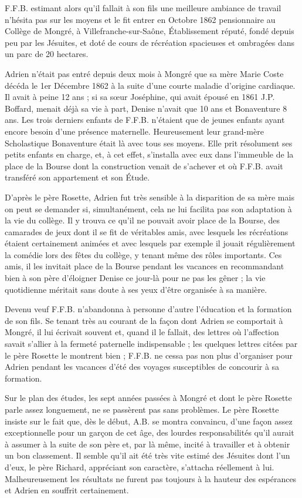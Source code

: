 \documentclass[11pt,a4paper]{report}
\begin{document}
F.F.B. estimant alors qu'il fallait à son fils une meilleure ambiance de travail n'hésita pas sur les moyens et le fit entrer en Octobre 1862 pensionnaire au Collège de Mongré, à Villefranche-sur-Saône, Établissement réputé, fondé depuis peu par les Jésuites, et doté de cours de récréation spacieuses et ombragées dans un parc de 20 hectares.

Adrien n'était pas entré depuis deux mois à Mongré que sa mère Marie Coste décéda le 1er Décembre 1862 à la suite d'une courte maladie d'origine cardiaque. Il avait à peine 12 ans ; si sa sœur Joséphine, qui avait épousé en 1861 J.P. Boffard, menait déjà sa vie à part, Denise n'avait que 10 ans et Bonaventure 8 ans. Les trois derniers enfants de F.F.B. n'étaient que de jeunes enfants ayant encore besoin d'une présence maternelle. Heureusement leur grand-mère Scholastique Bonaventure était là avec tous ses moyens. Elle prit résolument ses petits enfants en charge, et, à cet effet, s'installa avec eux dans l'immeuble de la place de la Bourse dont la construction venait de s'achever et où F.F.B. avait transféré son appartement et son Étude.


D'après le père Rosette, Adrien fut très sensible à la disparition de sa mère mais on peut se demander si, simultanément, cela ne lui facilita pas son adaptation à la vie du collège. Il y trouva ce qu'il ne pouvait avoir place de la Bourse, des camarades de jeux dont il se fit de véritables amis, avec lesquels les récréations étaient certainement animées et avec lesquels par exemple il jouait régulièrement la comédie lors des fêtes du collège, y tenant même des rôles importants. Ces amis, il les invitait place de la Bourse pendant les vacances en recommandant bien à son père d'éloigner Denise ce jour-là pour ne pas les gêner ; la vie quotidienne méritait sans doute à ses yeux d'être organisée à sa manière.

Devenu veuf F.F.B. n'abandonna à personne d'autre l'éducation et la formation de son fils. Se tenant très au courant de la façon dont Adrien se comportait à Mongré, il lui écrivait souvent et, quand il le fallait, des lettres où l'affection savait s'allier à la fermeté paternelle indispensable ; les quelques lettres citées par le père Rosette le montrent bien ; F.F.B. ne cessa pas non plus d'organiser pour Adrien pendant les vacances d'été des voyages susceptibles de concourir à sa formation.

Sur le plan des études, les sept années passées à Mongré et dont le père Rosette parle assez longuement, ne se passèrent pas sans problèmes. Le père Rosette insiste sur le fait que, dès le début, A.B. se montra convaincu, d'une façon assez exceptionnelle pour un garçon de cet âge, des lourdes responsabilités qu'il aurait à assumer à la suite de son père et, par là même, incité à travailler et à obtenir un bon classement. Il semble qu'il ait été très vite estimé des Jésuites dont l'un d'eux, le père Richard, appréciant son caractère, s'attacha réellement à lui. Malheureusement les résultats ne furent pas toujours à la hauteur des espérances et Adrien en souffrit certainement.
\end{document}
